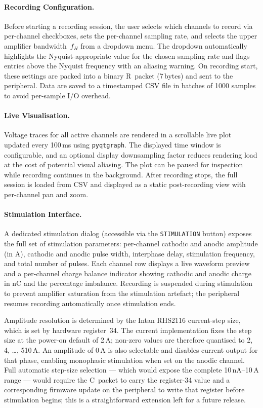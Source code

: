 \paragraph{Recording Configuration.}
Before starting a recording session, the user selects which channels to record
via per-channel checkboxes, sets the per-channel sampling rate, and selects the
upper amplifier bandwidth~$f_H$ from a dropdown menu. The dropdown automatically
highlights the Nyquist-appropriate value for the chosen sampling rate and flags
entries above the Nyquist frequency with an aliasing warning. On recording start,
these settings are packed into a binary R~packet (7\,bytes) and sent to the
peripheral. Data are saved to a timestamped CSV file in batches of 1000
samples to avoid per-sample I/O overhead.

\paragraph{Live Visualisation.}
Voltage traces for all active channels are rendered in a scrollable live plot
updated every 100\,ms using \texttt{pyqtgraph}. The displayed time window is
configurable, and an optional display downsampling factor reduces rendering load
at the cost of potential visual aliasing. The plot can be paused for inspection
while recording continues in the background. After recording stops, the full
session is loaded from CSV and displayed as a static post-recording view with
per-channel pan and zoom.

\paragraph{Stimulation Interface.}
A dedicated stimulation dialog (accessible via the \texttt{STIMULATION} button)
exposes the full set of stimulation parameters: per-channel cathodic and anodic amplitude (in \textmu A),
cathodic and anodic pulse width, interphase delay, stimulation frequency, and
total number of pulses. Each channel row displays a live waveform preview and a
per-channel charge balance indicator showing cathodic and anodic charge in nC
and the percentage imbalance. Recording is suspended during stimulation to
prevent amplifier saturation from the stimulation artefact; the peripheral
resumes recording automatically once stimulation ends.

Amplitude resolution is determined by the Intan RHS2116 current-step size,
which is set by hardware register~34.  The current implementation fixes the
step size at the power-on default of 2\,\textmu A; non-zero values are therefore
quantised to 2, 4, \ldots, 510\,\textmu A.  An amplitude of 0\,\textmu A is also
selectable and disables current output for that phase, enabling monophasic
stimulation when set on the anodic channel.  Full automatic step-size
selection --- which would expose the complete 10\,nA--10\,\textmu A range ---
would require the C~packet to carry the register-34 value and a corresponding
firmware update on the peripheral to write that register before stimulation
begins; this is a straightforward extension left for a future release.

